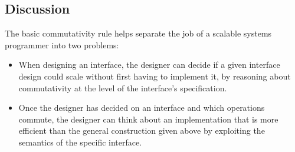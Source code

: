 \begin{comment}

\paragraph{Delayed allocation} You're designing an allocator.
It may run out of resources. You consider an interface design in which
the allocator returns an error indication if there are no free
resources. However, concurrent calls to the allocator therefor won't
commute, suggesting that there may not be a scalable implementation. You
think ``why not just have the allocator delay until resources become
available?'' With intuitive notions of commutativity, this appears to
make the allocator commutative, since there's no obvious difference
between a call when there were free resources and a call when there
weren't.
%
However, once you apply our careful definition of commutativity, you'll
realize that the delaying allocator doesn't make allocation commute.
Both the invocation and the response have to be in the re-interleaving
window. The definition says that every re-interleaving has to leave a legal
$R$. But you can't re-interleave the return of the allocation call that had
to wait so that it goes before the return of the allocation call that
didn't.
\end{comment}

\subsection{Discussion}

The basic commutativity rule helps separate the job of a scalable
systems programmer into
two problems:

\begin{itemize}

\item When designing an interface, the designer can decide if a given
  interface design could scale without first having to implement it,
  by reasoning about commutativity at the level of the interface's
  specification.

\item Once the designer has decided on an interface and which operations
  commute, the designer can think about an implementation that is
  more efficient than the general construction given above by exploiting the
  semantics of the specific interface.

\end{itemize}

